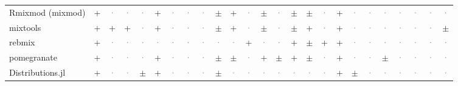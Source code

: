 \documentclass[10pt,a4paper]{article}
\begin{document}
\begin{landscape}
{\begin{longtable}{@{}l *{24}{c}@{}}
Rmixmod (mixmod) & \cellcolor{yes!35}+ & \textcolor{gray}{·} & \textcolor{gray}{·} & \textcolor{gray}{·} & \cellcolor{yes!35}+ & \textcolor{gray}{·} & \textcolor{gray}{·} & \textcolor{gray}{·} & \cellcolor{part!45}$\pm$ & \cellcolor{yes!35}+ & \textcolor{gray}{·} & \cellcolor{part!45}$\pm$ & \textcolor{gray}{·} & \cellcolor{part!45}$\pm$ & \cellcolor{part!45}$\pm$ & \textcolor{gray}{·} & \cellcolor{yes!35}+ & \textcolor{gray}{·} & \textcolor{gray}{·} & \textcolor{gray}{·} & \textcolor{gray}{·} & \textcolor{gray}{·} & \textcolor{gray}{·} & \textcolor{gray}{·} \\
mixtools & \cellcolor{yes!35}+ & \cellcolor{yes!35}+ & \cellcolor{yes!35}+ & \textcolor{gray}{·} & \cellcolor{yes!35}+ & \textcolor{gray}{·} & \textcolor{gray}{·} & \textcolor{gray}{·} & \cellcolor{part!45}$\pm$ & \cellcolor{yes!35}+ & \textcolor{gray}{·} & \cellcolor{part!45}$\pm$ & \textcolor{gray}{·} & \cellcolor{part!45}$\pm$ & \cellcolor{yes!35}+ & \textcolor{gray}{·} & \cellcolor{yes!35}+ & \textcolor{gray}{·} & \textcolor{gray}{·} & \textcolor{gray}{·} & \textcolor{gray}{·} & \textcolor{gray}{·} & \textcolor{gray}{·} & \cellcolor{part!45}$\pm$ \\
rebmix & \cellcolor{yes!35}+ & \textcolor{gray}{·} & \textcolor{gray}{·} & \textcolor{gray}{·} & \textcolor{gray}{·} & \textcolor{gray}{·} & \textcolor{gray}{·} & \textcolor{gray}{·} & \textcolor{gray}{·} & \textcolor{gray}{·} & \cellcolor{yes!35}+ & \textcolor{gray}{·} & \textcolor{gray}{·} & \cellcolor{yes!35}+ & \cellcolor{part!45}$\pm$ & \cellcolor{yes!35}+ & \cellcolor{yes!35}+ & \textcolor{gray}{·} & \textcolor{gray}{·} & \textcolor{gray}{·} & \textcolor{gray}{·} & \textcolor{gray}{·} & \textcolor{gray}{·} & \textcolor{gray}{·} \\
pomegranate & \cellcolor{yes!35}+ & \textcolor{gray}{·} & \textcolor{gray}{·} & \textcolor{gray}{·} & \cellcolor{yes!35}+ & \textcolor{gray}{·} & \textcolor{gray}{·} & \textcolor{gray}{·} & \cellcolor{part!45}$\pm$ & \cellcolor{part!45}$\pm$ & \textcolor{gray}{·} & \cellcolor{yes!35}+ & \cellcolor{part!45}$\pm$ & \cellcolor{yes!35}+ & \cellcolor{part!45}$\pm$ & \textcolor{gray}{·} & \cellcolor{yes!35}+ & \textcolor{gray}{·} & \textcolor{gray}{·} & \cellcolor{part!45}$\pm$ & \textcolor{gray}{·} & \textcolor{gray}{·} & \textcolor{gray}{·} & \textcolor{gray}{·} \\
Distributions.jl & \cellcolor{yes!35}+ & \textcolor{gray}{·} & \textcolor{gray}{·} & \cellcolor{part!45}$\pm$ & \cellcolor{yes!35}+ & \textcolor{gray}{·} & \textcolor{gray}{·} & \textcolor{gray}{·} & \cellcolor{part!45}$\pm$ & \textcolor{gray}{·} & \textcolor{gray}{·} & \textcolor{gray}{·} & \textcolor{gray}{·} & \textcolor{gray}{·} & \textcolor{gray}{·} & \textcolor{gray}{·} & \cellcolor{yes!35}+ & \cellcolor{part!45}$\pm$ & \textcolor{gray}{·} & \textcolor{gray}{·} & \textcolor{gray}{·} & \textcolor{gray}{·} & \textcolor{gray}{·} & \textcolor{gray}{·} \\

\end{longtable}}
\end{landscape}
\end{document}
